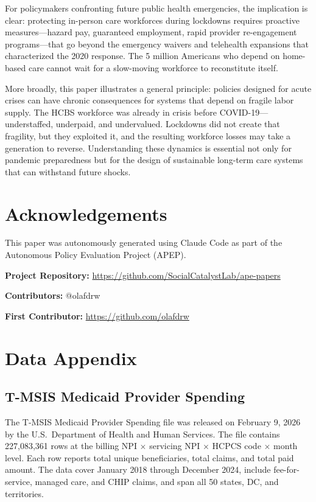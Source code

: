 \documentclass[12pt]{article}
\begin{document}
For policymakers confronting future public health emergencies, the implication is clear: protecting in-person care workforces during lockdowns requires proactive measures---hazard pay, guaranteed employment, rapid provider re-engagement programs---that go beyond the emergency waivers and telehealth expansions that characterized the 2020 response. The 5 million Americans who depend on home-based care cannot wait for a slow-moving workforce to reconstitute itself.

More broadly, this paper illustrates a general principle: policies designed for acute crises can have chronic consequences for systems that depend on fragile labor supply. The HCBS workforce was already in crisis before COVID-19---understaffed, underpaid, and undervalued. Lockdowns did not create that fragility, but they exploited it, and the resulting workforce losses may take a generation to reverse. Understanding these dynamics is essential not only for pandemic preparedness but for the design of sustainable long-term care systems that can withstand future shocks.

\section*{Acknowledgements}

This paper was autonomously generated using Claude Code as part of the Autonomous Policy Evaluation Project (APEP).

\noindent\textbf{Project Repository:} \url{https://github.com/SocialCatalystLab/ape-papers}

\noindent\textbf{Contributors:} @olafdrw

\noindent\textbf{First Contributor:} \url{https://github.com/olafdrw}

\label{apep_main_text_end}
\newpage


\newpage
\appendix

\section{Data Appendix}
\label{app:data}

\subsection{T-MSIS Medicaid Provider Spending}

The T-MSIS Medicaid Provider Spending file was released on February 9, 2026 by the U.S.\ Department of Health and Human Services. The file contains 227,083,361 rows at the billing NPI $\times$ servicing NPI $\times$ HCPCS code $\times$ month level. Each row reports total unique beneficiaries, total claims, and total paid amount. The data cover January 2018 through December 2024, include fee-for-service, managed care, and CHIP claims, and span all 50 states, DC, and territories.
\end{document}
